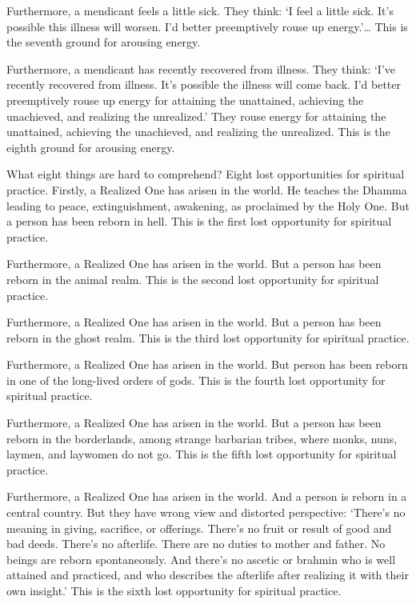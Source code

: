 \documentclass[12pt,openany]{book}%
\begin{document}
Furthermore, a mendicant feels a little sick. They think: ‘I feel a little sick. It’s possible this illness will worsen. I’d better preemptively rouse up energy.’… This is the seventh ground for arousing energy. 

Furthermore, a mendicant has recently recovered from illness. They think: ‘I’ve recently recovered from illness. It’s possible the illness will come back. I’d better preemptively rouse up energy for attaining the unattained, achieving the unachieved, and realizing the unrealized.’ They rouse energy for attaining the unattained, achieving the unachieved, and realizing the unrealized. This is the eighth ground for arousing energy. 

What eight things are hard to comprehend? Eight lost opportunities for spiritual practice. Firstly, a Realized One has arisen in the world. He teaches the Dhamma leading to peace, extinguishment, awakening, as proclaimed by the Holy One. But a person has been reborn in hell. This is the first lost opportunity for spiritual practice. 

Furthermore, a Realized One has arisen in the world. But a person has been reborn in the animal realm. This is the second lost opportunity for spiritual practice. 

Furthermore, a Realized One has arisen in the world. But a person has been reborn in the ghost realm. This is the third lost opportunity for spiritual practice. 

Furthermore, a Realized One has arisen in the world. But person has been reborn in one of the long-lived orders of gods. This is the fourth lost opportunity for spiritual practice. 

Furthermore, a Realized One has arisen in the world. But a person has been reborn in the borderlands, among strange barbarian tribes, where monks, nuns, laymen, and laywomen do not go. This is the fifth lost opportunity for spiritual practice. 

Furthermore, a Realized One has arisen in the world. And a person is reborn in a central country. But they have wrong view and distorted perspective: ‘There’s no meaning in giving, sacrifice, or offerings. There’s no fruit or result of good and bad deeds. There’s no afterlife. There are no duties to mother and father. No beings are reborn spontaneously. And there’s no ascetic or brahmin who is well attained and practiced, and who describes the afterlife after realizing it with their own insight.’ This is the sixth lost opportunity for spiritual practice. 
\end{document}
